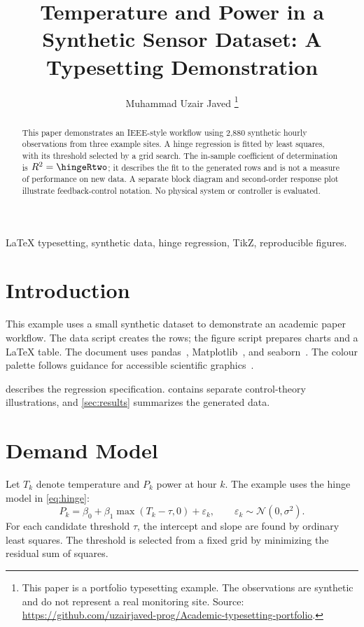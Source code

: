 \documentclass[journal]{IEEEtran}
\begin{document}
\title{Temperature and Power in a Synthetic Sensor Dataset: A Typesetting Demonstration}

\author{Muhammad Uzair Javed%
\thanks{This paper is a portfolio typesetting example. The observations are synthetic and do not represent a real monitoring site. Source: \url{https://github.com/uzairjaved-prog/Academic-typesetting-portfolio}.}}

\maketitle

\begin{abstract}
This paper demonstrates an IEEE-style workflow using 2,880 synthetic hourly observations from three example sites. A hinge regression is fitted by least squares, with its threshold selected by a grid search. The in-sample coefficient of determination is $R^2=\hingeRtwo$; it describes the fit to the generated rows and is not a measure of performance on new data. A separate block diagram and second-order response plot illustrate feedback-control notation. No physical system or controller is evaluated.
\end{abstract}

\begin{IEEEkeywords}
LaTeX typesetting, synthetic data, hinge regression, TikZ, reproducible figures.
\end{IEEEkeywords}

\section{Introduction}
This example uses a small synthetic dataset to demonstrate an academic paper workflow. The data script creates the rows; the figure script prepares charts and a LaTeX table. The document uses pandas~\cite{mckinney2010pandas}, Matplotlib~\cite{hunter2007matplotlib}, and seaborn~\cite{waskom2021seaborn}. The colour palette follows guidance for accessible scientific graphics~\cite{wong2011color}.

 describes the regression specification.  contains separate control-theory illustrations, and \cref{sec:results} summarizes the generated data.

\section{Demand Model}\label{sec:model}
Let $T_k$ denote temperature and $P_k$ power at hour $k$. The example uses the hinge model in \cref{eq:hinge}:
\begin{equation}
  P_k = \beta_0 + \beta_1\max(T_k-\tau,0)+\varepsilon_k,
  \qquad \varepsilon_k\sim\mathcal{N}(0,\sigma^2).
  \label{eq:hinge}
\end{equation}
For each candidate threshold $\tau$, the intercept and slope are found by ordinary least squares. The threshold is selected from a fixed grid by minimizing the residual sum of squares.
\end{document}
